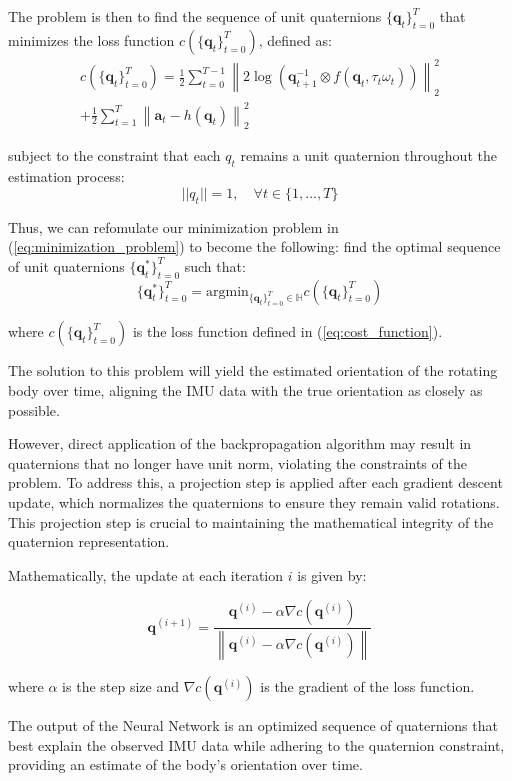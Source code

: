 \documentclass[conference]{IEEEtran}
\begin{document}
The problem is then to find the sequence of unit quaternions \( \{\bm{q}_t\}_{t=0}^T \) that minimizes the loss function \(
c(\{\bm{q}_t\}_{t=0}^T) \), defined as:
\begin{multline}\label{eq:cost_function}
c(\{\bm{q}_t\}_{t=0}^T) = \frac{1}{2} \sum_{t=0}^{T-1} \left\lVert 2\log\left(\bm{q}_{t+1}^{-1} \otimes f(\bm{q}_t, \tau_t\omega_t)\right)\right\rVert_{2}^{2} \\
+ \frac{1}{2} \sum_{t=1}^T \left\lVert \bm{a}_t - h(\bm{q}_t)\right\rVert_{2}^{2}
\end{multline}

subject to the constraint that each \( q_t \) remains a unit quaternion throughout the estimation process:
\[ ||q_t|| = 1, \quad \forall t \in \{1, \ldots, T\} \]

Thus, we can refomulate our minimization problem in (\ref{eq:minimization_problem}) to become the following: find the
optimal sequence of unit quaternions \( \{\bm{q}_t^*\}_{t=0}^T \) such that:
\[ \{\bm{q}_t^*\}_{t=0}^T = \text{argmin}_{\{\bm{q}_t\}_{t=0}^T \in \mathbb{H}} c(\{\bm{q}_t\}_{t=0}^T) \]

where $c(\{\bm{q}_t\}_{t=0}^T)$ is the loss function defined in (\ref{eq:cost_function}).

The solution to this problem will yield the estimated orientation of the rotating body over time, aligning the IMU data with the true orientation as closely as possible.

However, direct application of the backpropagation algorithm may result in quaternions that no longer have unit norm, violating the constraints of the problem. To address this, a projection step is applied after each gradient descent update, which normalizes the quaternions to ensure they remain valid rotations. This projection step is crucial to maintaining the mathematical integrity of the quaternion representation.

Mathematically, the update at each iteration \( i \) is given by:

\[ \bm{q}^{(i+1)} = \frac{\bm{q}^{(i)} - \alpha \nabla c(\bm{q}^{(i)})}{\left\lVert \bm{q}^{(i)} - \alpha \nabla c(\bm{q}^{(i)}) \right\rVert} \]

where \( \alpha \) is the step size and \( \nabla c(\bm{q}^{(i)}) \) is the gradient of the loss function.

The output of the Neural Network is an optimized sequence of quaternions that best explain the observed IMU data while adhering to the quaternion constraint, providing an estimate of the body's orientation over time.
\end{document}

